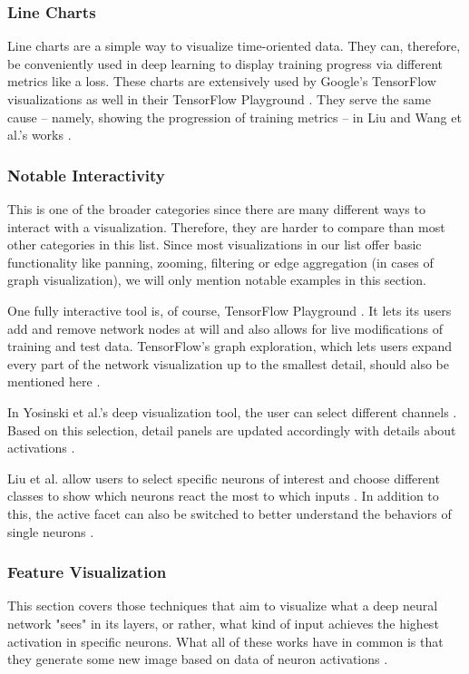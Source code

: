\documentclass{acmsiggraph}               %
\begin{document}
\subsubsection{Line Charts}
Line charts are a simple way to visualize time-oriented data. They can, therefore, be conveniently used in deep learning to display training progress via different metrics like a loss. These charts are extensively used by Google's TensorFlow visualizations as well in their TensorFlow Playground \cite{Wongsuphasawat2018,Smilkov2017}.
They serve the same cause -- namely, showing the progression of training metrics -- in Liu and Wang et al.'s works \cite{Liu2018,Wang}.
\subsubsection{Notable Interactivity}
This is one of the broader categories since there are many different ways to interact with a visualization. Therefore, they are harder to compare than most other categories in this list. Since most visualizations in our list offer basic functionality like panning, zooming, filtering or edge aggregation (in cases of graph visualization), we will only mention notable examples in this section.

One fully interactive tool is, of course, TensorFlow Playground \cite{Smilkov2017}. It lets its users add and remove network nodes at will and also allows for live modifications of training and test data. TensorFlow's graph exploration, which lets users expand every part of the network visualization up to the smallest detail, should also be mentioned here \cite{Wongsuphasawat2018}.

In Yosinski et al.'s deep visualization tool, the user can select different channels \cite{Yosinski2015}. Based on this selection, detail panels are updated accordingly with details about activations \cite{Yosinski2015}.

Liu et al. allow users to select specific neurons of interest and choose different classes to show which neurons react the most to which inputs \cite{Liu2016}. In addition to this, the active facet can also be switched to better understand the behaviors of single neurons \cite{Liu2016}.
\subsubsection{Feature Visualization}
This section covers those techniques that aim to visualize what a deep neural network "sees" in its layers, or rather, what kind of input achieves the highest activation in specific neurons. What all of these works have in common is that they generate some new image based on data of neuron activations \cite{Hohman2018}.
\end{document}
